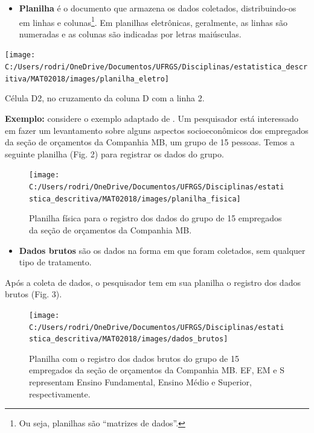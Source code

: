 \documentclass[nofonts,]{tufte-handout}
\providecommand{\tightlist}{%
  \setlength{\itemsep}{0pt}\setlength{\parskip}{0pt}}
\begin{document}
\begin{itemize}
\tightlist
\item
  \textbf{Planilha} é o documento que armazena os dados coletados,
  distribuindo-os em linhas e colunas\footnote{Ou seja, planilhas são
    ``matrizes de dados''.}. Em planilhas eletrônicas, geralmente, as
  linhas são numeradas e as colunas são indicadas por letras maiúsculas.
\end{itemize}

\begin{marginfigure}
\texttt{[image: C:/Users/rodri/OneDrive/Documentos/UFRGS/Disciplinas/estatistica\_descritiva/MAT02018/images/planilha\_eletro]} \caption[Célula D2, no cruzamento da coluna D com a linha 2]{Célula D2, no cruzamento da coluna D com a linha 2.}\label{fig:fig-plan_eletro}
\end{marginfigure}

\textbf{Exemplo:} considere o exemplo adaptado de
\citep{morettin_estatistica_2017}. Um pesquisador está interessado em
fazer um levantamento sobre alguns aspectos socioeconômicos dos
empregados da seção de orçamentos da Companhia MB, um grupo de 15
pessoas. Temos a seguinte planilha (Fig. 2) para registrar os dados do
grupo.

\begin{figure}
\texttt{[image: C:/Users/rodri/OneDrive/Documentos/UFRGS/Disciplinas/estatistica\_descritiva/MAT02018/images/planilha\_fisica]} \caption[Planilha física para o registro dos dados do grupo de 15 empregados da seção de orçamentos da Companhia MB]{Planilha física para o registro dos dados do grupo de 15 empregados da seção de orçamentos da Companhia MB.}\label{fig:fig-plan_fis}
\end{figure}

\begin{itemize}
\tightlist
\item
  \textbf{Dados brutos} são os dados na forma em que foram coletados,
  sem qualquer tipo de tratamento.
\end{itemize}

Após a coleta de dados, o pesquisador tem em sua planilha o registro dos
dados brutos (Fig. 3).

\begin{figure}
\texttt{[image: C:/Users/rodri/OneDrive/Documentos/UFRGS/Disciplinas/estatistica\_descritiva/MAT02018/images/dados\_brutos]} \caption[Planilha com o registro dos dados brutos do grupo de 15 empregados da seção de orçamentos da Companhia MB]{Planilha com o registro dos dados brutos do grupo de 15 empregados da seção de orçamentos da Companhia MB. EF, EM e S representam Ensino Fundamental, Ensino Médio e Superior, respectivamente.}\label{fig:fig-dados_brutos}
\end{figure}
\end{document}
